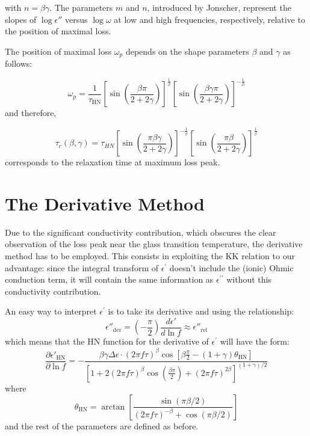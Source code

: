 with \( n = \beta \gamma \). The parameters \( m \) and \( n \), introduced by Jonscher, represent the slopes of \( \log \epsilon'' \) versus \( \log \omega \) at low and high frequencies, respectively, relative to the position of maximal loss.

The position of maximal loss \( \omega_p \) depends on the shape parameters \( \beta \) and \( \gamma \) as follows:

\[
\omega_p = \frac{1}{\tau_{\text{HN}}} \left[ \sin \left(\frac{\beta \pi}{2 + 2\gamma}\right) \right]^{\frac{1}{\beta}} \left[\sin \left(\frac{\beta \gamma \pi}{2 + 2\gamma}\right)\right]^{-\frac{1}{\beta}}
\]
and therefore,

\[
	\tau_c(\beta, \gamma) = \tau_{HN} \left[\sin\left(\frac{\pi \beta \gamma}{2 + 2\gamma}\right)\right]^{-\frac{1}{\beta}} \left[\sin\left(\frac{\pi \beta}{2 + 2\gamma}\right)\right]^{\frac{1}{\beta}}
\]
corresponds to the relaxation time at maximum loss peak.
\section{The Derivative Method}

Due to the significant conductivity contribution, which obscures the clear observation of the loss peak near the glass transition temperature, the derivative method has to be employed. %
This consists in exploiting the \ac{KK} relation to our advantage: since the integral transform of $\epsilon^\prime$ doesn't include the (ionic) Ohmic conduction term, it will contain the same information as $\epsilon^{\prime\prime}$ without this conductivity contribution.

An easy way to interpret $\epsilon^\prime$ is to take its derivative and using the relationship: \[
\epsilon''_{\text{der}} = \left(-\frac{\pi}{2}\right)\frac{d\epsilon'}{d\ln f} \approx \epsilon''_{\text{rel}}
\]
which means that the HN function for the derivative of $\epsilon^{\prime}$ will have the form: \[
\frac{\partial \epsilon'_{\text{HN}}}{\partial \ln f} = -\frac{\beta \gamma \Delta \epsilon \cdot (2\pi f \tau)^\beta \cos \left[\beta \frac{\pi}{2} - (1+\gamma)\theta_{\text{HN}}\right]}{\left[1 + 2(2\pi f \tau)^\beta \cos \left(\frac{\beta \pi}{2}\right) + (2\pi f \tau)^{2\beta}\right]^{(1+\gamma)/2}}
\]
where \[
\theta_{\text{HN}} = \arctan \left[\frac{\sin(\pi \beta / 2)}{(2\pi f \tau)^{-\beta} + \cos(\pi \beta / 2)}\right]
\]
and the rest of the parameters are defined as before.

